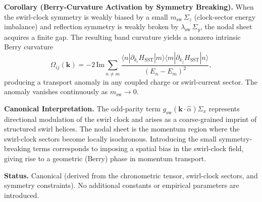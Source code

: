 \documentclass[10pt,reprint,aps,onecolumn,nofootinbib]{revtex4-2}
\begin{document}
            \medskip
            \noindent
            \textbf{Corollary (Berry-Curvature Activation by Symmetry Breaking).}
            When the swirl-clock symmetry is weakly biased by a small
            $m_{\text{sw}}\,\Sigma_z$ (clock-sector energy imbalance) and reflection
            symmetry is weakly broken by $\lambda_{\text{sw}}\,\Sigma_y$, the nodal sheet
            acquires a finite gap. The resulting band curvature yields a nonzero intrinsic
            Berry curvature
            \begin{equation}
                \Omega_{ij}(\mathbf{k})
                = -2\,\mathrm{Im}\!
                \sum_{n\neq m}
                \frac{
                    \langle n|\partial_{k_i}H_{\text{SST}}|m\rangle
                    \langle m|\partial_{k_j}H_{\text{SST}}|n\rangle
                }{
                    (E_n - E_m)^2
                },
            \end{equation}
            producing a transport anomaly in any coupled charge or swirl-current sector.
            The anomaly vanishes continuously as $m_{\text{sw}}\!\rightarrow\!0$.

            \medskip
            \noindent
            \textbf{Canonical Interpretation.}
            The odd-parity term $g_{\text{sw}}(\mathbf{k}\cdot\hat{\alpha})\Sigma_x$
            represents directional modulation of the swirl clock and arises as a
            coarse-grained imprint of structured swirl helices. The nodal sheet is the
            momentum region where the swirl-clock sectors become locally isochronous.
            Introducing the small symmetry-breaking terms corresponds to imposing a spatial
            bias in the swirl-clock field, giving rise to a geometric (Berry) phase in
            momentum transport.

            \medskip
            \noindent
            \textbf{Status.}
            Canonical (derived from the chronometric tensor, swirl-clock sectors, and
            symmetry constraints). No additional constants or empirical parameters are
            introduced.
\end{document}
